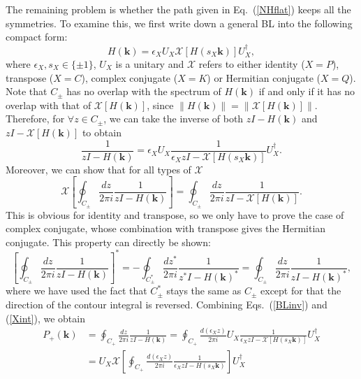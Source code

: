\documentclass{tADP2e}
\theoremstyle{plain}
\theoremstyle{plain}
\theoremstyle{definition}
\begin{document}
\begin{appendices}
The remaining problem is whether the path given in Eq.~(\ref{NHflat}) keeps all the symmetries. To examine this, we first write down a general BL into the following compact form:
\begin{equation}
H(\boldsymbol{k})=\epsilon_XU_X\mathcal{X}[H(s_X\boldsymbol{k})]U_X^\dag,
\end{equation}
where $\epsilon_X,s_X\in\{\pm1\}$, $U_X$ is a unitary and $\mathcal{X}$ refers to either identity ($X=P$), transpose ($X=C$), complex conjugate ($X=K$) or Hermitian conjugate ($X=Q$). Note that $C_\pm$ has no overlap with the spectrum of $H(\boldsymbol{k})$ if and only if it has no overlap with that of $\mathcal{X}[H(\boldsymbol{k})]$, since $\|H(\boldsymbol{k})\|=\|\mathcal{X}[H(\boldsymbol{k})]\|$. Therefore, for $\forall z\in C_\pm$, we can take the inverse of both $zI-H(\boldsymbol{k})$ and $zI-\mathcal{X}[H(\boldsymbol{k})]$ to obtain
\begin{equation}
\frac{1}{zI-H(\boldsymbol{k})}=\epsilon_X U_X\frac{1}{\epsilon_X zI-\mathcal{X}[H(s_X\boldsymbol{k})]} U_X^\dag.
\label{BLinv}
\end{equation}
Moreover, we can show that for all types of $\mathcal{X}$ 
\begin{equation}
\mathcal{X}\left[\oint_{C_\pm}\frac{dz}{2\pi i}\frac{1}{zI-H(\boldsymbol{k})}\right]=\oint_{C_\pm}\frac{dz}{2\pi i}\frac{1}{zI-\mathcal{X}[H(\boldsymbol{k})]}.
\label{Xint}
\end{equation}
This is obvious for identity and transpose, so we only have to prove the case of complex conjugate, whose combination with transpose gives the Hermitian conjugate. This property can directly be shown:
\begin{equation}
\left[\oint_{C_\pm}\frac{dz}{2\pi i}\frac{1}{zI-H(\boldsymbol{k})}\right]^*=-\oint_{C^*_\pm}\frac{dz^*}{2\pi i}\frac{1}{z^*I-H(\boldsymbol{k})^*}=\oint_{C_\pm}\frac{dz}{2\pi i}\frac{1}{zI-H(\boldsymbol{k})^*},
\end{equation} 
where we have used the fact that $C^*_\pm$ stays the same as $C_\pm$ except for that the direction of the contour integral is reversed. Combining Eqs.~(\ref{BLinv}) and (\ref{Xint}), we obtain
\begin{equation}
\begin{split}
P_+(\boldsymbol{k})&=\oint_{C_+}\frac{dz}{2\pi i}\frac{1}{zI-H(\boldsymbol{k})}=\oint_{C_+}\frac{d(\epsilon_Xz)}{2\pi i}U_X\frac{1}{\epsilon_XzI-\mathcal{X}[H(s_X\boldsymbol{k})]}U_X^\dag \\
&=U_X\mathcal{X}\left[\oint_{C_+}\frac{d(\epsilon_Xz)}{2\pi i}\frac{1}{\epsilon_XzI-H(s_X\boldsymbol{k})}\right]U_X^\dag \\

\end{split}
\end{equation}
\end{appendices}
\end{document}
